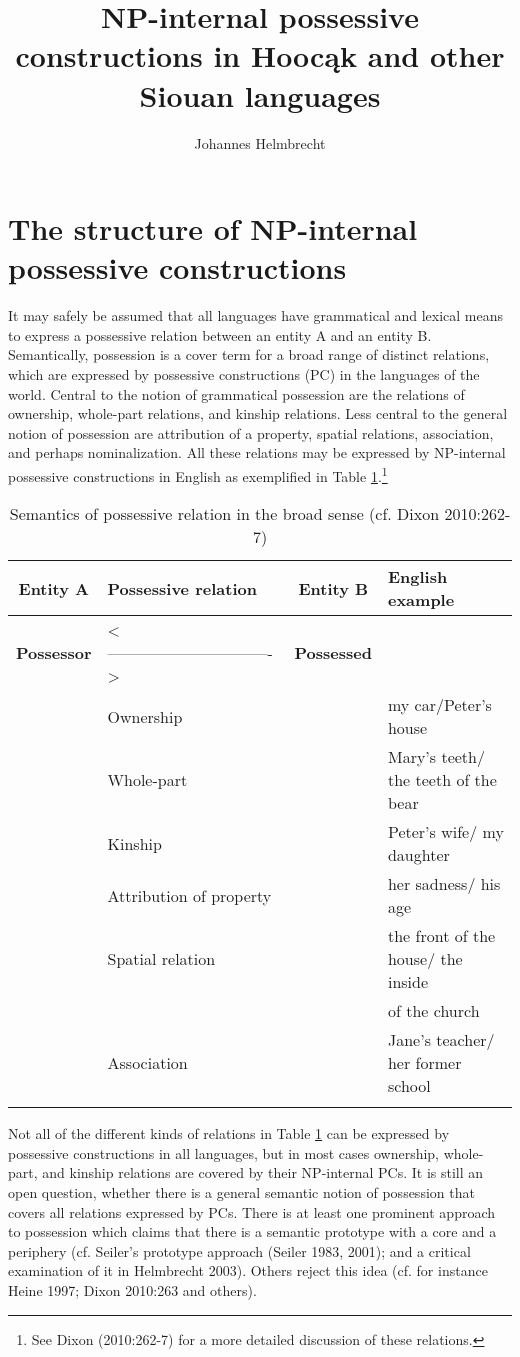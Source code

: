 \documentclass[output=paper]{LSP/langsci}
\author{Johannes Helmbrecht}
\title{NP-internal possessive constructions in Hoocąk and other Siouan languages}
\begin{document}
\section{The structure of NP-internal possessive constructions}
It may safely be assumed that all languages have grammatical and lexical means to express a possessive relation between an entity A and an entity B. Semantically, possession is a cover term for a broad range of distinct relations, which are expressed by possessive constructions (PC) in the languages of the world. Central to the notion of grammatical possession are the relations of ownership, whole-part relations, and kinship relations. Less central to the general notion of possession are attribution of a property, spatial relations, association, and perhaps nominalization. All these relations may be expressed by NP-internal possessive constructions in English as exemplified in Table \ref{semantics}.\footnote{See Dixon (2010:262-7) for a more detailed discussion of these relations.}

\begin{table}
\caption{Semantics of possessive relation in the broad sense (cf. Dixon 2010:262-7)} \label{semantics}
\small
\begin{tabular}[h!]{ c l c l }
\lsptoprule
\textbf{Entity A}  & \textbf{Possessive relation}	 & \textbf{Entity B} & \textbf{English example} \\
\midrule
\textbf{Possessor} & <------------------------------->	 & \textbf{Possessed} & \\
& Ownership	&  & my car/Peter's house \\
& Whole-part	 & & Mary's teeth/ the teeth of the bear \\
& Kinship	 & & Peter's wife/ my daughter \\
& Attribution of property & & her sadness/ his age \\
& Spatial relation & & the front of the house/ the inside   \\
& & & of the church \\
& Association & & Jane's teacher/ her former school \\
\lspbottomrule
\end{tabular}
\end{table}

Not all of the different kinds of relations in Table \ref{semantics} can be expressed by possessive constructions in all languages, but in most cases ownership, whole-part, and kinship relations are covered by their NP-internal PCs. It is still an open question, whether there is a general semantic notion of possession that covers all relations expressed by PCs. There is at least one prominent approach to possession which claims that there is a semantic prototype with a core and a periphery (cf. Seiler's prototype approach (Seiler 1983, 2001); and a critical examination of it in Helmbrecht 2003). Others reject this idea (cf. for instance Heine 1997; Dixon 2010:263 and others).
\end{document}
